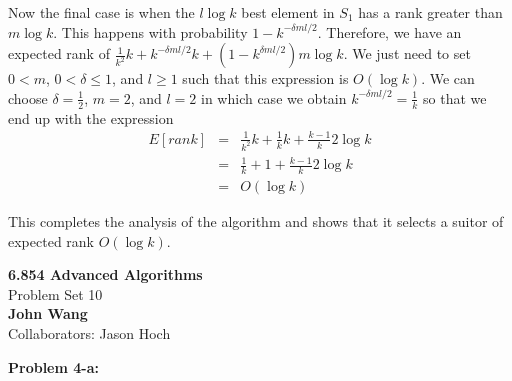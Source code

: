 \documentclass[psamsfonts]{amsart}
\newenvironment{sol}{\vspace{0.25cm}{\large \bfseries Solution:}}{\qedsymbol}
\newenvironment{prob}[1]{\begin{framed}{\large \bfseries Problem #1:}}{\end{framed}}
\newcommand{\makenewtitle}{
    \begin{center}
    {\huge \bfseries 6.854 Advanced Algorithms} \\
    Problem Set 10\\
    \vspace{0.25cm}
    {\bfseries John Wang} \\
    Collaborators: Jason Hoch 
    \end{center}
    \vspace{0.5cm}
}
\begin{document}
\begin{sol}
Now the final case is when the $l \log k$ best element in $S_1$ has a rank greater than $m \log k$. This happens with probability $1 - k^{- \delta m l / 2}$. Therefore, we have an expected rank of $\frac{1}{k^2} k + k^{-\delta m l /2} k + (1 - k^{\delta m l /2}) m \log k$. We just need to set $0 < m$, $0 < \delta \leq 1$, and $l \geq 1$  such that this expression is $O(\log k)$. We can choose $\delta = \frac{1}{2}$, $m = 2$, and $l = 2$ in which case we obtain $k^{-\delta m l / 2} = \frac{1}{k}$ so that we end up with the expression
\begin{eqnarray}
E[rank] &=& \frac{1}{k^2}{k} + \frac{1}{k} k + \frac{k-1}{k} 2 \log k \\
&=& \frac{1}{k} + 1 + \frac{k-1}{k} 2 \log k \\
&=& O(\log k)
\end{eqnarray}

This completes the analysis of the algorithm and shows that it selects a suitor of expected rank $O(\log k)$. 
\end{sol}


\newpage
\makenewtitle

\begin{prob}{4-a}

\end{prob}
\end{document}
